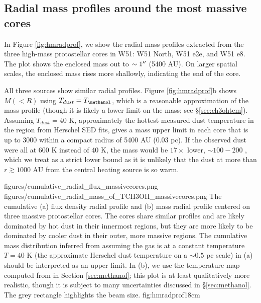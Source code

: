 \documentclass[twocolumn]{aastex61}
\begin{document}
\subsection{Radial mass profiles around the most massive cores}
\label{sec:radialmass}
In Figure \ref{fig:hmradprof}, we show the radial mass profiles extracted from the
three high-mass protostellar cores in W51: W51 North, W51 e2e, and W51 e8.
The plot shows the enclosed mass out to $\sim1\mbox{$^{\prime\prime}$}$ (5400 AU).  On larger
spatial scales, the enclosed mass rises more shallowly, indicating the end of the
core.

All three sources show similar radial profiles.  Figure \ref{fig:hmradprof}b
shows $M(<R)$ using $T_{dust}=T_{\scriptsize{\methanol}}$, which is a reasonable
approximation of the mass profile (though it is likely a lower limit on
the mass; see \S \ref{sec:ch3ohtem}).  Assuming $T_{dust}=40$ K, approximately
the hottest measured dust temperature in the region from Herschel SED fits,
gives a mass upper limit in each core that is up to 3000 \msun within a compact
radius of 5400 AU (0.03 pc).  If the observed dust were all at 600 K instead of
40 K, the mass would be $17\times$ lower, $\sim100-200$ \msun, which we treat
as a strict lower bound as it is unlikely that the dust at more than
$r\gtrsim1000$ AU from the central heating source is so warm.  




\FigureTwo
{figures/cumulative_radial_flux_massivecores.png}
{figures/cumulative_radial_mass_of_TCH3OH_massivecores.png}
{The cumulative (a) flux density radial profile and (b) mass radial profile
centered on three massive protostellar cores.  The cores share similar profiles
and are likely dominated by hot dust in their innermost regions, but they are
more likely to be dominated by cooler dust in their outer, more massive
regions.  The cumulative mass distribution inferred from assuming the gas is at
a constant temperature $T=40$ K (the approximate Herschel dust temperature on a
$\sim0.5$ pc scale) in (a) should be interpreted as an upper limit.  In (b), we
use the temperature map computed from \methanol in Section \ref{sec:methanol};
this plot is at least qualitatively more realistic, though it is subject to
many uncertainties discussed in \S \ref{sec:methanol}.  The grey rectangle
highlights the beam size.}
{fig:hmradprof}{1}{8cm}
\end{document}
